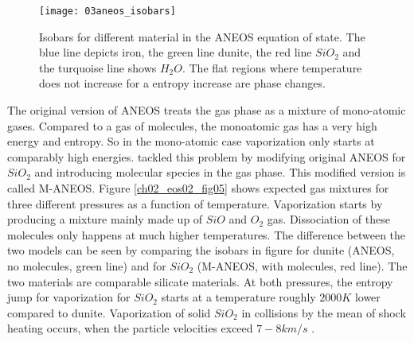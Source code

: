 \begin{figure}
\begin{center}
\texttt{[image: 03aneos\_isobars]}
\caption{Isobars for different material in the ANEOS equation of state. The blue line depicts iron, the green line dunite, the red line $SiO_2$ and the turquoise line shows $H_2 O$. The flat regions where temperature does not increase for a entropy increase are phase changes. }
\label{ch02_eos02_fig01}
\end{center}
\end{figure}

The original version of ANEOS treats the gas phase as a mixture of mono-atomic gases. Compared to a gas of molecules, the monoatomic gas has a very high energy and entropy. So in the mono-atomic case vaporization only starts at comparably high energies. \cite{Melosh:2007p3502} tackled this problem by modifying original ANEOS for $SiO_2$ and introducing molecular species in the gas phase. This modified version is called M-ANEOS. Figure \ref{ch02_eos02_fig05} shows expected gas mixtures for three different pressures as a function of temperature. Vaporization starts by producing a mixture mainly made up of $SiO$ and $O_2$ gas. Dissociation of these molecules only happens at much higher temperatures. The difference between the two models can be seen by comparing the isobars in figure for dunite (ANEOS, no molecules, green line) and for $SiO_2$ (M-ANEOS, with molecules, red line). The two materials are comparable silicate materials. At both pressures, the entropy jump for vaporization for $SiO_2$ starts at a temperature roughly $2000K$ lower compared to dunite. Vaporization of solid $SiO_2$ in collisions by the mean of shock heating occurs, when the particle velocities exceed $7-8km/s$ \citep{Melosh:2007p3502}.

